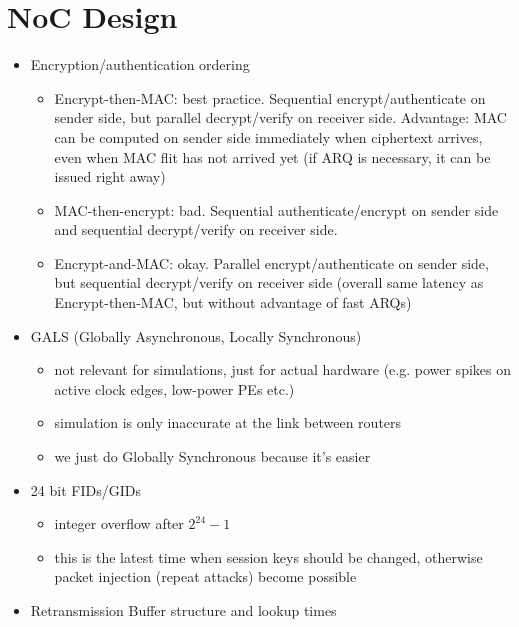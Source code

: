 \documentclass[
	paper=a4,
	fontsize=11pt,
	parskip=full %
]{scrreprt}
\begin{document}
    \chapter{NoC Design}
    \begin{itemize}
        \item Encryption/authentication ordering
            \begin{itemize}
                \item Encrypt-then-MAC: best practice. Sequential encrypt/authenticate on sender side, but parallel decrypt/verify
                    on receiver side. Advantage: MAC can be computed on sender side immediately when ciphertext arrives, even when
                    MAC flit has not arrived yet (if ARQ is necessary, it can be issued right away)
                \item MAC-then-encrypt: bad. Sequential authenticate/encrypt on sender side and sequential decrypt/verify on receiver
                    side.
                \item Encrypt-and-MAC: okay. Parallel encrypt/authenticate on sender side, but sequential decrypt/verify on receiver
                    side (overall same latency as Encrypt-then-MAC, but without advantage of fast ARQs)
            \end{itemize}
        \item GALS (Globally Asynchronous, Locally Synchronous)
            \begin{itemize}
                \item not relevant for simulations, just for actual hardware (e.g. power spikes on active clock edges, low-power PEs etc.)
                \item simulation is only inaccurate at the link between routers
                \item we just do Globally Synchronous because it's easier
            \end{itemize}
        \item 24 bit FIDs/GIDs
            \begin{itemize}
                \item integer overflow after $2^{24}-1$
                \item this is the latest time when session keys should be changed, otherwise packet injection (repeat attacks) become
                    possible
            \end{itemize}
        \item Retransmission Buffer structure and lookup times

\end{itemize}
\end{document}
